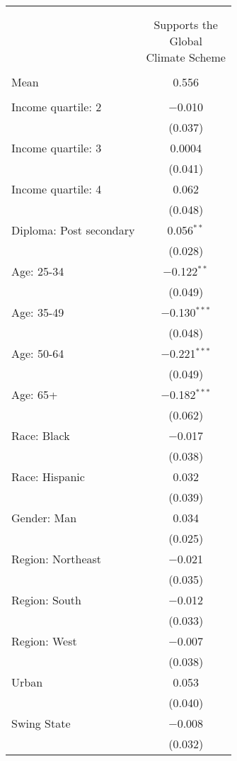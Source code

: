 
\begin{tabular}{@{\extracolsep{5pt}}lc} 
\\[-1.8ex]\hline 
\hline \\[-1.8ex] 
\\[-1.8ex] & \makecell{Supports the\\Global\\Climate Scheme} \\ 
\hline \\[-1.8ex] 
Mean & 0.556  \\ \hline \\[-1.8ex]
 Income quartile: 2 & $-$0.010 \\ 
  & (0.037) \\ 
  Income quartile: 3 & 0.0004 \\ 
  & (0.041) \\ 
  Income quartile: 4 & 0.062 \\ 
  & (0.048) \\ 
  Diploma: Post secondary & 0.056$^{**}$ \\ 
  & (0.028) \\ 
  Age: 25-34 & $-$0.122$^{**}$ \\ 
  & (0.049) \\ 
  Age: 35-49 & $-$0.130$^{***}$ \\ 
  & (0.048) \\ 
  Age: 50-64 & $-$0.221$^{***}$ \\ 
  & (0.049) \\ 
  Age: 65+ & $-$0.182$^{***}$ \\ 
  & (0.062) \\ 
  Race: Black & $-$0.017 \\ 
  & (0.038) \\ 
  Race: Hispanic & 0.032 \\ 
  & (0.039) \\ 
  Gender: Man & 0.034 \\ 
  & (0.025) \\ 
  Region: Northeast & $-$0.021 \\ 
  & (0.035) \\ 
  Region: South & $-$0.012 \\ 
  & (0.033) \\ 
  Region: West & $-$0.007 \\ 
  & (0.038) \\ 
  Urban & 0.053 \\ 
  & (0.040) \\ 
  Swing State & $-$0.008 \\ 
  & (0.032) \\ 

\end{tabular}
